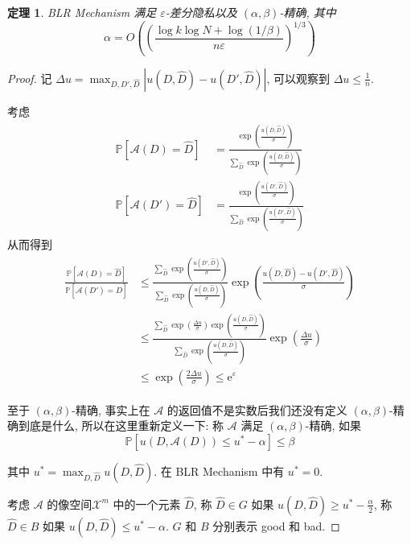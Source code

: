 \documentclass[8pt]{article}
\theoremstyle{compact}
\newtheorem{theorem}{定理}[section]
\def\le{\leqslant}
\def\ge{\geqslant}
\def\P#1{\mathbb{P}\left[{#1}\right]}
\def\e{\mathrm{e}}
\begin{document}
\begin{theorem}
	BLR Mechanism 满足 $\varepsilon$-差分隐私以及 $(\alpha, \beta)$-精确, 其中 $$\alpha = O \left(\left(\frac{\log k \log N + \log(1 / \beta)}{n\varepsilon}\right)^{1/3}\right)$$
\end{theorem}
\begin{proof}
	记 $\Delta u = \max_{D, D', \hat{D}}|u(D, \hat{D}) - u(D', \hat{D})|$, 可以观察到 $\Delta u \le \frac1n$.

	考虑 \begin{align*}
		\begin{split}
			\P{\mathcal A(D) = \hat{D}} &= \frac{\exp\left(\frac{u(D, \hat{D})}{\sigma}\right)}{\sum_{\hat{D}}\exp\left(\frac{u(D, \hat{D})}{\sigma}\right)}\\
			\P{\mathcal A(D') = \hat{D}} &= \frac{\exp\left(\frac{u(D', \hat{D})}{\sigma}\right)}{\sum_{\hat{D}}\exp\left(\frac{u(D', \hat{D})}{\sigma}\right)}
		\end{split}
	\end{align*}
	从而得到 \begin{align*}
		\begin{split}
			\frac{\P{\mathcal A(D) = \hat{D}}}{\P{\mathcal A(D') = \hat{D}}} &\le \frac{\sum_{\hat{D}}\exp\left(\frac{u(D', \hat{D})}{\sigma}\right)}{\sum_{\hat{D}}\exp\left(\frac{u(D, \hat{D})}{\sigma}\right)}\exp\left(\frac{u(D, \hat{D}) - u(D', \hat{D})}{\sigma}\right) \\
			&\le \frac{\sum_{\hat{D}}\exp\left(\frac{\Delta u}{\sigma}\right)\exp\left(\frac{u(D, \hat{D})}{\sigma}\right)}{\sum_{\hat{D}}\exp\left(\frac{u(D, \hat{D})}{\sigma}\right)}\exp\left(\frac{\Delta u}{\sigma}\right) \\
			&\le \exp\left(\frac{2\Delta u}{\sigma}\right) \le \e^{\varepsilon}
		\end{split}
	\end{align*}
	

	至于 $(\alpha, \beta)$-精确, 事实上在 $\mathcal A$ 的返回值不是实数后我们还没有定义 $(\alpha, \beta)$-精确到底是什么, 所以在这里重新定义一下: 称 $\mathcal A$ 满足 $(\alpha, \beta)$-精确, 如果 $$\P{u(D, \mathcal A(D)) \le u^* - \alpha} \le \beta$$

	其中 $u^* = \max_{D, \hat{D}}u(D, \hat{D})$. 在 BLR Mechanism 中有 $u^* = 0$.

	考虑 $\mathcal A$ 的像空间$\mathcal X^m$ 中的一个元素 $\hat{D}$, 称 $\hat{D} \in G$ 如果 $u(D, \hat{D}) \ge u^* - \frac{\alpha}2$, 称 $\hat{D} \in B$ 如果 $u(D, \hat{D}) \le u^* - \alpha$. $G$ 和 $B$ 分别表示 good 和 bad.


\end{proof}
\end{document}
